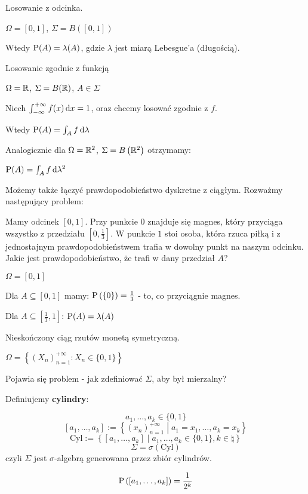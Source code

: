 \begin{example}
    Losowanie z odcinka.

    \( \Omega = [ 0, 1] \), \( \Sigma = B\left([0, 1] \right) \)

    Wtedy \( \operatorname{P}(A) = \lambda(A) \), gdzie \( \lambda \) jest miarą Lebesgue'a (długością).
    
\end{example}

\begin{example}
    Losowanie zgodnie z funkcją

    \( \Omega = \mathbb{R} \), \( \Sigma = B(\mathbb{R}) \), \( A \in \Sigma \)

    Niech \( \int_{-\infty}^{+\infty} f(x) \mathop{}\!\mathrm{d} x = 1 \), oraz chcemy losować zgodnie z \( f \).

    Wtedy \( \operatorname{P}(A) = \int_A f \mathop{}\!\mathrm{d} \lambda \) 

    Analogicznie dla \( \Omega = \mathbb{R}^2 \), \( \Sigma = B\left( \mathbb{R}^2 \right) \) otrzymamy:

    \( \operatorname{P}(A) = \int_A f \mathop{}\!\mathrm{d} \lambda^2 \)

\end{example}

\begin{example}

    Możemy także łączyć prawdopodobieństwo dyskretne z ciągłym. Rozważmy następujący problem:

    Mamy odcinek \( [0, 1] \). Przy punkcie \( 0 \) znajduje się magnes, który przyciąga wszystko z przedziału \( [0, \frac{1}{3}] \). W punkcie \( 1 \) stoi osoba, która rzuca piłką i z jednostajnym prawdopodobieństwem trafia w dowolny punkt na naszym odcinku. Jakie jest prawdopodobieństwo, że trafi w dany przedział \( A \)?

    \( \Omega = [0, 1] \)

    Dla \( A \subseteq [0, 1] \) mamy: \( \operatorname{P}\left(\{0\}\right) = \frac{1}{3} \) - to, co przyciągnie magnes.

    Dla \( A \subseteq [\frac{1}{3}, 1] \): \( \operatorname{P}(A) = \lambda(A) \)

\end{example}

\begin{example}
    Nieskończony ciąg rzutów monetą symetryczną.

    \( \Omega = \left\{ (X_n)_{n = 1}^{+\infty} : X_n \in \{0, 1\} \right\} \)

    Pojawia się problem - jak zdefiniować \( \Sigma \), aby był mierzalny?

    Definiujemy \textbf{cylindry}:

    \[ 
        a_1, \ldots, a_k \in \{0, 1\} 
    \]
    \[ 
        [a_1, \ldots, a_k] := \left\{ (x_n)_{n=1}^{+\infty} \middle| a_1 = x_1, \ldots, a_k = x_k \right\} 
    \]
    \[ 
        \text{Cyl} := \left\{ [a_1, \ldots, a_k] \middle| a_1, \ldots, a_k \in \{0, 1\}, k \in \natural \right\} 
    \]
    \[ 
        \Sigma = \sigma\left( \text{Cyl} \right) 
    \] 
    czyli \( \Sigma \) jest \( \sigma \)-algebrą generowana przez zbiór cylindrów.

    \[ 
        \operatorname{P}\left( [a_1, \ldots, a_k] \right) = \frac{1}{2^k} 
    \]
\end{example}

